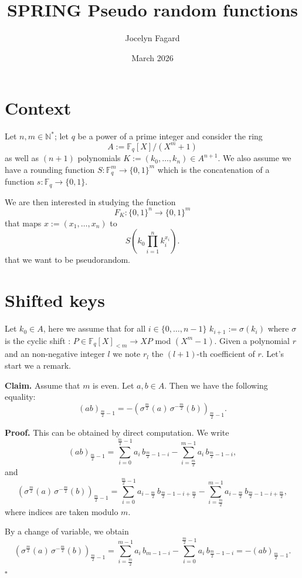 \documentclass{article}
\title{SPRING Pseudo random functions}
\author{Jocelyn Fagard}
\date{March 2026}
\begin{document}
\maketitle

\section{Context}
Let $n,m \in \mathbb{N}^*$; let $q$ be a power of a prime integer and consider the ring
\[
A := \mathbb{F}_q[X]/(X^m + 1)
\]
as well as $(n+1)$ polynomials $K:=(k_0, \dots, k_n) \in A^{n+1}$.
We also assume we have a rounding function $S : \mathbb{F}_q^m \to \{0,1\}^m$ which is the concatenation of a function $s : \mathbb{F}_q \to \{0,1\}$.

We are then interested in studying the function
\[
F_K : \{0,1\}^n \to \{0,1\}^m
\]
that maps $x := (x_1, \dots, x_n)$ to
\[
S\!\left( k_0 \prod_{i=1}^n k_i^{x_i} \right).
\] that we want to be pseudorandom.

\section{Shifted keys}
Let $k_0 \in A$, here we assume that for all $i \in \{0,\dots,n-1\}$ $k_{i+1}:= \sigma(k_i)$ where $\sigma$ is the cyclic shift  : $P \in \mathbb{F}_q[X]_{<m} \to X  P$ mod $(X^m-1)$.
Given a polynomial $r$ and an non-negative integer $l$ we note $r_l$ the $(l+1)$-th coefficient of $r$. Let's start we a remark.

\textbf{Claim.} Assume that $m$ is even.
Let $a,b \in A$. Then we have the following equality:
\[
(ab)_{\frac{m}{2} - 1}
=
- \left( \sigma^{\frac{m}{2}}(a)\, \sigma^{-\frac{m}{2}}(b) \right)_{\frac{m}{2} - 1}.
\]

\medskip

\textbf{Proof.}
This can be obtained by direct computation. We write
\[
(ab)_{\frac{m}{2} - 1}
=
\sum_{i=0}^{\frac{m}{2}-1} a_i \, b_{\frac{m}{2}-1 - i}
-
\sum_{i=\frac{m}{2}}^{m-1} a_i \, b_{\frac{m}{2}-1 - i},
\]
and
\[
\left( \sigma^{\frac{m}{2}}(a)\, \sigma^{-\frac{m}{2}}(b) \right)_{\frac{m}{2} - 1}
=
\sum_{i=0}^{\frac{m}{2}-1} a_{i-\frac{m}{2}} \, b_{\frac{m}{2}-1-i+\frac{m}{2}}
-
\sum_{i=\frac{m}{2}}^{m-1} a_{i-\frac{m}{2}} \, b_{\frac{m}{2}-1-i+\frac{m}{2}},
\]
where indices are taken modulo $m$.

By a change of variable, we obtain
\[
\left( \sigma^{\frac{m}{2}}(a)\, \sigma^{-\frac{m}{2}}(b) \right)_{\frac{m}{2} - 1}
=
\sum_{i=\frac{m}{2}}^{m-1} a_i \, b_{m-1-i}
-
\sum_{i=0}^{\frac{m}{2}-1} a_i \, b_{\frac{m}{2}-1-i}
=
- (ab)_{\frac{m}{2} - 1}.
\]
\hfill $\square$
\end{document}
